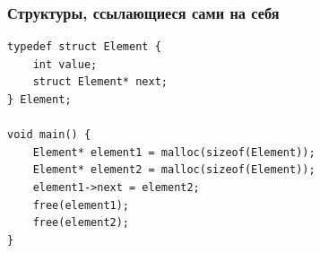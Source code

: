 \documentclass{../../slides-style}
\begin{document}
	
	\begin{frame}[plain]
        \titlepage
    \end{frame}
	
	\begin{frame}[fragile]
		\frametitle{Структуры, ссылающиеся сами на себя}
		\begin{footnotesize}
			\begin{verbatim}
typedef struct Element {
    int value;
    struct Element* next;
} Element;

void main() {
    Element* element1 = malloc(sizeof(Element));
    Element* element2 = malloc(sizeof(Element));
    element1->next = element2;
    free(element1);
    free(element2);
}
			\end{verbatim}
		\end{footnotesize}
	\end{frame}
\end{document}
